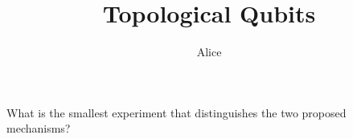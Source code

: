 \documentclass[11pt]{article}
\title{Topological Qubits}
\author{Alice}
\date{}
\begin{document}
\maketitle

What is the smallest experiment that distinguishes the two proposed mechanisms?
\end{document}

